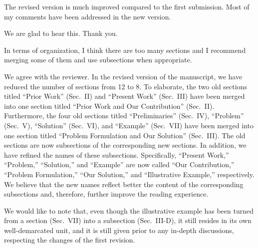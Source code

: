 \begin{reviewer}
The revised version is much improved compared to the first submission. Most of
my comments have been addressed in the new version.
\end{reviewer}

\begin{authors}
We are glad to hear this. Thank you.
\end{authors}

\begin{reviewer}
In terms of organization, I think there are too many sections and I recommend
merging some of them and use subsections when appropriate.
\end{reviewer}

\begin{authors}
We agree with the reviewer. In the revised version of the manuscript, we have
reduced the number of sections from 12 to 8. To elaborate, the two old sections
titled ``Prior Work'' (Sec.~II) and ``Present Work'' (Sec.~III) have been merged
into one section titled ``Prior Work and Our Contribution'' (Sec.~II).
Furthermore, the four old sections titled ``Preliminaries'' (Sec.~IV),
``Problem'' (Sec.~V), ``Solution'' (Sec.~VI), and ``Example'' (Sec.~VII) have
been merged into one section titled ``Problem Formulation and Our Solution''
(Sec.~III). The old sections are now subsections of the corresponding new
sections. In addition, we have refined the names of these subsections.
Specifically, ``Present Work,'' ``Problem,'' ``Solution,'' and ``Example'' are
now called ``Our Contribution,'' ``Problem Formulation,'' ``Our Solution,'' and
``Illustrative Example,'' respectively. We believe that the new names reflect
better the content of the corresponding subsections and, therefore, further
improve the reading experience.

We would like to note that, even though the illustrative example has been turned
from a section (Sec.~VII) into a subsection (Sec.~III-D), it still resides in
its own well-demarcated unit, and it is still given prior to any in-depth
discussions, respecting the changes of the first revision.

\begin{actions}

\end{actions}
\end{authors}

